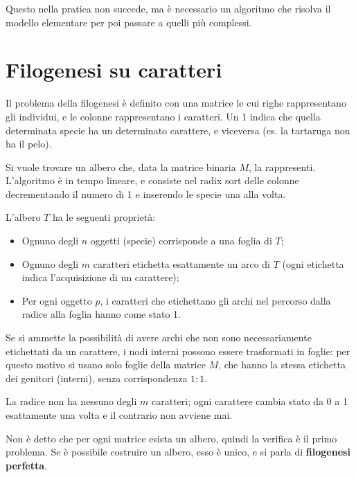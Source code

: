 Questo nella pratica non succede, ma è necessario un algoritmo che risolva il modello elementare per poi passare a quelli più complessi.

\newpage
\section{Filogenesi su caratteri}
Il problema della filogenesi è definito con una matrice le cui righe rappresentano gli individui, e le colonne rappresentano i caratteri. Un 1 indica che quella determinata specie ha un determinato carattere, e viceversa (es. la tartaruga non ha il pelo).

Si vuole trovare un albero che, data la matrice binaria $M$, la rappresenti. L'algoritmo è in tempo lineare, e consiste nel radix sort delle colonne decrementando il numero di 1 e inserendo le specie una alla volta. 

L'albero $T$ ha le seguenti proprietà:
\begin{itemize}
	\item Ognuno degli $n$ oggetti (specie) corrisponde a una foglia di $T$;
	\item Ognuno degli $m$ caratteri etichetta esattamente un arco di $T$ (ogni etichetta indica l'acquisizione di un carattere);
	\item Per ogni oggetto $p$, i caratteri che etichettano gli archi nel percorso dalla radice alla foglia hanno come stato 1.
\end{itemize}

Se si ammette la possibilità di avere archi che non sono necessariamente etichettati da un carattere, i nodi interni possono essere trasformati in foglie: per questo motivo si usano solo foglie della matrice $M$, che hanno la stessa etichetta dei genitori (interni), senza corrispondenza $1 : 1$.

La radice non ha nessuno degli $m$ caratteri; ogni carattere cambia stato da 0 a 1 esattamente una volta e il contrario non avviene mai.

Non è detto che per ogni matrice esista un albero, quindi la verifica è il primo problema. Se è possibile costruire un albero, esso è unico, e si parla di \textbf{filogenesi perfetta}.

